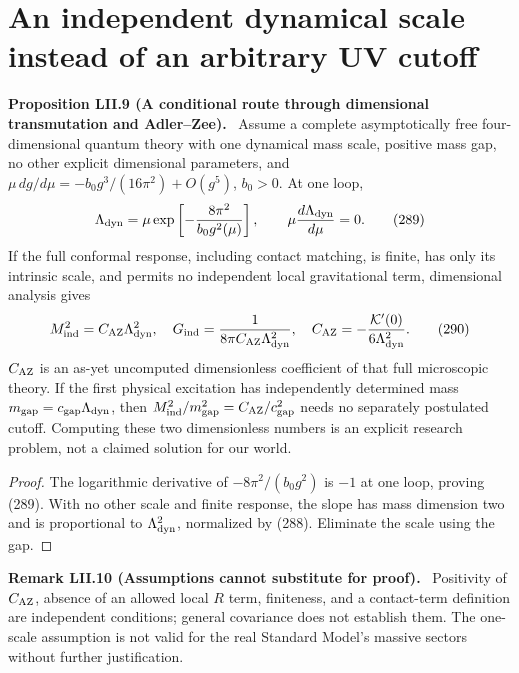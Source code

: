\documentclass[11pt,a4paper,oneside]{book}
\newcommand{\statement}[3]{\par\medskip\noindent\textbf{#1 #2 (#3).}\ }
\begin{document}
\section{An independent dynamical scale instead of an arbitrary UV cutoff}
\statement{Proposition}{LII.9}{A conditional route through dimensional transmutation and Adler--Zee}
Assume a complete asymptotically free four-dimensional quantum theory with one dynamical mass scale, positive mass gap, no other explicit dimensional parameters, and $\mu\,dg/d\mu=-b_0g^3/(16\pi^2)+O(g^5)$, $b_0>0$. At one loop,
\begin{equation}\Lambda_{\rm dyn}=\mu\exp\left[-\frac{8\pi^2}{b_0g^2(\mu)}\right],\qquad\mu\frac{d\Lambda_{\rm dyn}}{d\mu}=0.\tag{289}\end{equation}
If the full conformal response, including contact matching, is finite, has only its intrinsic scale, and permits no independent local gravitational term, dimensional analysis gives
\begin{equation}M_{\rm ind}^2=C_{\rm AZ}\Lambda_{\rm dyn}^2,\quad G_{\rm ind}=\frac1{8\pi C_{\rm AZ}\Lambda_{\rm dyn}^2},\quad C_{\rm AZ}=-\frac{\mathcal K'(0)}{6\Lambda_{\rm dyn}^2}.\tag{290}\end{equation}
$C_{\rm AZ}$ is an as-yet uncomputed dimensionless coefficient of that full microscopic theory. If the first physical excitation has independently determined mass $m_{\rm gap}=c_{\rm gap}\Lambda_{\rm dyn}$, then $M_{\rm ind}^2/m_{\rm gap}^2=C_{\rm AZ}/c_{\rm gap}^2$ needs no separately postulated cutoff. Computing these two dimensionless numbers is an explicit research problem, not a claimed solution for our world.
\begin{proof}
The logarithmic derivative of $-8\pi^2/(b_0g^2)$ is $-1$ at one loop, proving (289). With no other scale and finite response, the slope has mass dimension two and is proportional to $\Lambda_{\rm dyn}^2$, normalized by (288). Eliminate the scale using the gap.
\end{proof}
\statement{Remark}{LII.10}{Assumptions cannot substitute for proof}
Positivity of $C_{\rm AZ}$, absence of an allowed local $R$ term, finiteness, and a contact-term definition are independent conditions; general covariance does not establish them. The one-scale assumption is not valid for the real Standard Model's massive sectors without further justification.
\end{document}
